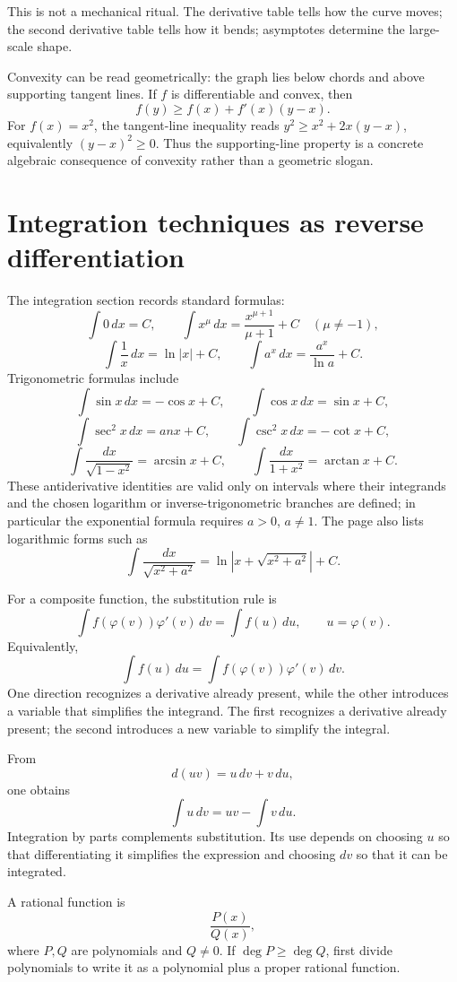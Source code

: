 This is not a mechanical ritual.  The derivative table tells how the curve moves; the second derivative table tells how it bends; asymptotes determine the large-scale shape.

Convexity can be read geometrically: the graph lies below chords and above supporting tangent lines.  If \(f\) is differentiable and convex, then
\[
  f(y)\ge f(x)+f'(x)(y-x).
\]
For \(f(x)=x^2\), the tangent-line inequality reads \(y^2\ge x^2+2x(y-x)\), equivalently \((y-x)^2\ge0\). Thus the supporting-line property is a concrete algebraic consequence of convexity rather than a geometric slogan.

\section{Integration techniques as reverse differentiation}

The integration section records standard formulas:
\[
  \int 0\,dx=C,\qquad
  \int x^\mu\,dx=
\frac{x^{\mu+1}}{\mu+1}+C\quad(\mu\ne-1),
\]
\[
  \int
\frac1x\,dx=\ln|x|+C,
  \qquad
  \int a^x\,dx=
\frac{a^x}{\ln a}+C.
\]
Trigonometric formulas include
\[
  \int\sin x\,dx=-\cos x+C,\qquad
  \int\cos x\,dx=\sin x+C,
\]
\[
  \int\sec^2x\,dx=	an x+C,\qquad
  \int\csc^2x\,dx=-\cot x+C,
\]
\[
  \int
\frac{dx}{\sqrt{1-x^2}}=\arcsin x+C,
  \qquad
  \int
\frac{dx}{1+x^2}=\arctan x+C.
\]
These antiderivative identities are valid only on intervals where their integrands and the chosen logarithm or inverse-trigonometric branches are defined; in particular the exponential formula requires \(a>0\), \(a\ne1\). The page also lists logarithmic forms such as
\[
  \int
\frac{dx}{\sqrt{x^2+a^2}}
  =\ln|x+\sqrt{x^2+a^2}|+C.
\]

For a composite function, the substitution rule is
\[
  \int f(\varphi(v))\varphi'(v)\,dv
  =
  \int f(u)\,du,
  \qquad u=\varphi(v).
\]
Equivalently,
\[
  \int f(u)\,du
  =
  \int f(\varphi(v))\varphi'(v)\,dv.
\]
One direction recognizes a derivative already present, while the other introduces a variable that simplifies the integrand.  The first recognizes a derivative already present; the second introduces a new variable to simplify the integral.

From
\[
  d(uv)=u\,dv+v\,du,
\]
one obtains
\[
  \int u\,dv=uv-\int v\,du.
\]
Integration by parts complements substitution.  Its use depends on choosing $u$ so that differentiating it simplifies the expression and choosing $dv$ so that it can be integrated.

A rational function is
\[
\frac{P(x)}{Q(x)},
\]
where $P,Q$ are polynomials and $Q\ne0$.  If $\deg P\ge \deg Q$, first divide polynomials to write it as a polynomial plus a proper rational function.

